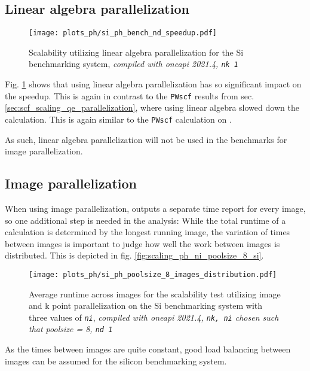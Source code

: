 \documentclass[main.tex]{subfiles}
\begin{document}
\subsection{Linear algebra parallelization}

\begin{figure}[htb!]
    \centering
    \texttt{[image: plots\_ph/si\_ph\_bench\_nd\_speedup.pdf]}
    \caption{Scalability utilizing linear algebra parallelization for the Si benchmarking system, \emph{\QE compiled with \gls{oneapi} 2021.4, \texttt{nk 1}}}
    \label{fig:scaling_ph_nd_si}
\end{figure}
Fig. \ref{fig:scaling_ph_nd_si} shows that using linear algebra parallelization has so significant impact on the speedup.
This is again in contrast to the \texttt{PWscf} results from sec. \ref{sec:scf_scaling_qe_parallelization}, where using linear algebra slowed down the calculation.
This is again similar to the \texttt{PWscf} calculation on \TaS.

As such, linear algebra parallelization will not be used in the benchmarks for image parallelization.

\subsection{Image parallelization}\label{sub:scaling_ph_images}

When using image parallelization, \QE outputs a separate time report for every image, so one additional step is needed in the analysis:
While the total runtime of a calculation is determined by the longest running image, the variation of times between images is important to judge how well the work between images is distributed.
This is depicted in fig. \ref{fig:scaling_ph_ni_poolsize_8_si}.

\begin{figure}[htb!]
    \centering
    \texttt{[image: plots\_ph/si\_ph\_poolsize\_8\_images\_distribution.pdf]}
    \caption{Average runtime across images for the scalability test utilizing image and k point parallelization on the Si benchmarking system with three values of \emph{\texttt{ni}}, \emph{\QE compiled with \gls{oneapi} 2021.4, \texttt{nk, ni} chosen such that poolsize = 8, \texttt{nd 1}}}
    \label{fig:scaling_ph_ni_poolsize_8_si_distribution}
\end{figure}
As the times between images are quite constant, good load balancing between images can be assumed for the silicon benchmarking system.
\end{document}

